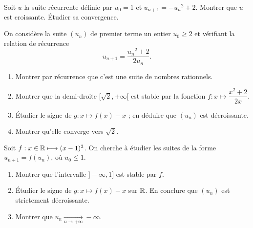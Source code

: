 \documentclass[../main.tex]{subfiles}
\begin{document}
\begin{exo}[D]
	Soit $u$ la suite récurrente définie par $u_0=1$ et $u_{n+1} = -{u_n}^2 + 2$. Montrer que $u$ est croissante. Étudier sa convergence.
\end{exo}

\begin{exo}[D]
	On considère la suite $(u_n)$ de premier terme un entier $u_0\geq 2$ et vérifiant la relation de récurrence \[u_{n+1}=\frac{{u_n}^2+2}{2u_n}.\] 
	\begin{enumerate}
		\item Montrer par récurrence que c'est une suite de nombres rationnels.
		\item Montrer que la demi-droite $[\sqrt{2},+\infty[$ est stable par la fonction $f:x\longmapsto \dfrac{x^2 + 2}{2x}$.
		\item Étudier le signe de $g:x\longmapsto f(x)-x$ ; en déduire que $(u_n)$ est décroissante.
		\item Montrer qu'elle converge vers $\sqrt{2}$.
	\end{enumerate}
\end{exo}


\begin{exo}[TD]
	Soit $f:x\in\mathbb R \longmapsto (x-1)^3$. On cherche à étudier les suites de la forme $u_{n+1}=f(u_n)$, où $u_0\leq 1$.\begin{enumerate}
		\item Montrer que l'intervalle $]-\infty,1]$ est stable par $f$.
		\item Étudier le signe de $g:x\longmapsto f(x)-x$ sur $\mathbb R$. En conclure que $(u_n)$ est strictement décroissante.
		\item Montrer que $u_n\xrightarrow[n\to+\infty]{}-\infty$.
	\end{enumerate}
\end{exo}
\end{document}
